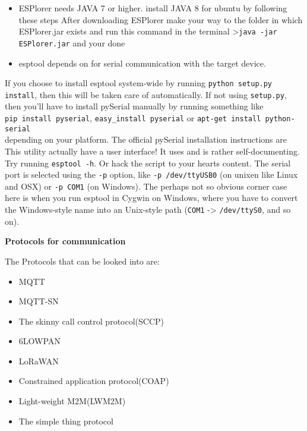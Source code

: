 \documentclass[16pt]{article}
\begin{document}
\begin{itemize}

\item
  ESPlorer needs JAVA 7 or higher. install JAVA 8 for ubuntu by
  following these steps
  After downloading ESPlorer make your way to the folder in which
  ESPlorer.jar exists and run this command in the terminal
  \textgreater{}\texttt{java -jar ESPlorer.jar} and your done
\item
  esptool depends on %
  for serial communication with the target device.
\end{itemize}

If you choose to install esptool system-wide by running
\texttt{python setup.py install}, then this will be taken care of
automatically.
If not using \texttt{setup.py}, then you'll have to install pySerial
manually by running something like \\

\texttt{pip install pyserial},
\texttt{easy\_install pyserial} or
\texttt{apt-get install python-serial} \\
\vspace{0.3cm}
depending on your platform. The
official pySerial installation instructions are
This utility actually have a user interface! It uses
and is rather self-documenting. Try running \texttt{esptool -h}. Or hack the
script to your hearts content. The serial port is selected using the
\texttt{-p} option, like \texttt{-p /dev/ttyUSB0} (on unixen like Linux
and OSX) or \texttt{-p COM1} (on Windows). The perhaps not so obvious
corner case here is when you run esptool in Cygwin on Windows, where you
have to convert the Windows-style name into an Unix-style path
(\texttt{COM1} -\textgreater{} \texttt{/dev/ttyS0}, and so on).

\vspace{9cm}


{\LARGE{\textbf{Protocols for communication}}}

\vspace{0.5cm}

The Protocols that can be looked into are:

\begin{itemize}

\item
  MQTT
\item
  MQTT-SN
\item
  The skinny call control protocol(SCCP)
\item
  6LOWPAN
\item
  LoRaWAN
\item
  Constrained application protocol(COAP)
\item
  Light-weight M2M(LWM2M)
\item
  The simple thing protocol
\end{itemize}
\end{document}
